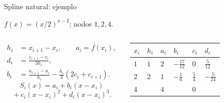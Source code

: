 \documentclass[original_version/main.tex]{subfiles}
\begin{document}
\begin{frame}[t]{Spline natural: ejemplo}
\par\noindent\begin{minipage}[t][9mm][t]{\textwidth}\small\strut $f(x)=(x/2)^{x-2}$; nodos $1,2,4$.\end{minipage}\par\nointerlineskip
\begin{columns}[T]\scriptsize\begin{align*}
h_i&=x_{i+1}-x_i,\qquad a_i=f(x_i),\\
d_i&=\frac{c_{i+1}-c_i}{3h_i},\\
b_i&=\frac{a_{i+1}-a_i}{h_i}-\frac{h_i}{3}(2c_i+c_{i+1}).
\end{align*}\scriptsize\[S_i(x)=a_i+b_i(x-x_i)\]\[{}+c_i(x-x_i)^2+d_i(x-x_i)^3.\]\begin{minipage}[t]{\textwidth}\begingroup\scriptsize\setlength{\tabcolsep}{2pt}\begin{center}\begin{tabular}{|C{.12\textwidth}|C{.12\textwidth}|C{.12\textwidth}|C{.12\textwidth}|C{.12\textwidth}|C{.12\textwidth}|}\hline
\rule[-2mm]{0pt}{6mm}$x_i$&$h_i$&$a_i$&$b_i$&$c_i$&$d_i$\\\hline
\rule[-2.5mm]{0pt}{7mm}$1$&$1$&$2$&$-\frac{17}{12}$&$0$&$\frac{5}{12}$\\\hline
\rule[-2.5mm]{0pt}{7mm}$2$&$2$&$1$&$-\frac{1}{6}$&$\frac{5}{4}$&$-\frac{5}{24}$\\\hline
\rule[-2.5mm]{0pt}{7mm}$4$&&$4$&&$0$&\\\hline
\end{tabular}\end{center}\endgroup\end{minipage}\par
\end{columns}
\end{frame}
\end{document}
